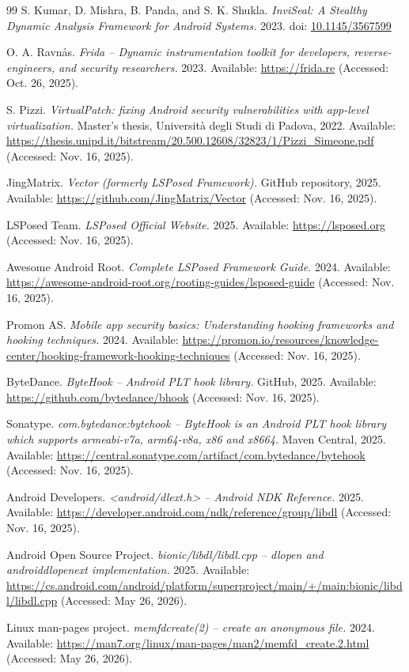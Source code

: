 \documentclass[11pt,a4paper]{report}
\renewcommand\_{{\textunderscore\allowbreak}}
\begin{document}
\begin{thebibliography}{99}
S. Kumar, D. Mishra, B. Panda, and S. K. Shukla.
\textit{InviSeal: A Stealthy Dynamic Analysis Framework for Android Systems.}
2023.
doi: \href{https://doi.org/10.1145/3567599}{10.1145/3567599}

O. A. Ravnås.
\textit{Frida – Dynamic instrumentation toolkit for developers, reverse-engineers, and security researchers.}
2023. Available:
\url{https://frida.re}
(Accessed: Oct. 26, 2025).

S. Pizzi.
\textit{VirtualPatch: fixing Android security vulnerabilities with app-level virtualization.}
Master's thesis, Università degli Studi di Padova, 2022. Available:
\url{https://thesis.unipd.it/bitstream/20.500.12608/32823/1/Pizzi_Simeone.pdf}
(Accessed: Nov. 16, 2025).

JingMatrix.
\textit{Vector (formerly LSPosed Framework).}
GitHub repository, 2025. Available:
\url{https://github.com/JingMatrix/Vector}
(Accessed: Nov. 16, 2025).

LSPosed Team.
\textit{LSPosed Official Website.}
2025. Available:
\url{https://lsposed.org}
(Accessed: Nov. 16, 2025).

Awesome Android Root.
\textit{Complete LSPosed Framework Guide.}
2024. Available:
\url{https://awesome-android-root.org/rooting-guides/lsposed-guide}
(Accessed: Nov. 16, 2025).

Promon AS.
\textit{Mobile app security basics: Understanding hooking frameworks and hooking techniques.}
2024. Available:
\url{https://promon.io/resources/knowledge-center/hooking-framework-hooking-techniques}
(Accessed: Nov. 16, 2025).

ByteDance.
\textit{ByteHook – Android PLT hook library.}
GitHub, 2025. Available:
\url{https://github.com/bytedance/bhook}
(Accessed: Nov. 16, 2025).

Sonatype.
\textit{com.bytedance:bytehook – ByteHook is an Android PLT hook library which supports armeabi-v7a, arm64-v8a, x86 and x86\_64.}
Maven Central, 2025. Available:
\url{https://central.sonatype.com/artifact/com.bytedance/bytehook}
(Accessed: Nov. 16, 2025).

Android Developers.
\textit{\textless android/dlext.h\textgreater{} -- Android NDK Reference.}
2025. Available:
\url{https://developer.android.com/ndk/reference/group/libdl}
(Accessed: Nov. 16, 2025).

Android Open Source Project.
\textit{bionic/libdl/libdl.cpp -- dlopen and android\_dlopen\_ext implementation.}
2025. Available:
\url{https://cs.android.com/android/platform/superproject/main/+/main:bionic/libdl/libdl.cpp}
(Accessed: May 26, 2026).

Linux man-pages project.
\textit{memfd\_create(2) -- create an anonymous file.}
2024. Available:
\url{https://man7.org/linux/man-pages/man2/memfd_create.2.html}
(Accessed: May 26, 2026).

\end{thebibliography}
\end{document}

